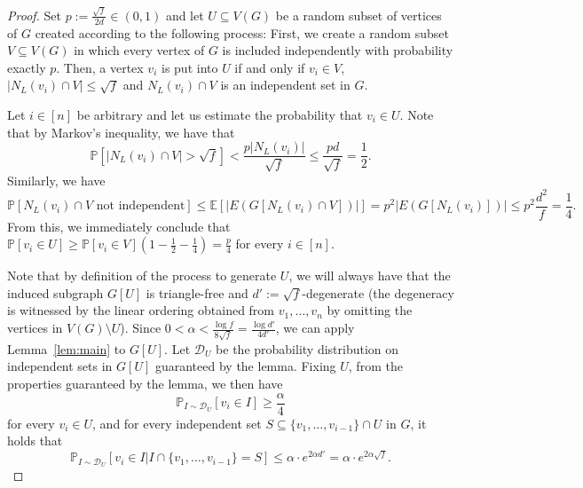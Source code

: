 \documentclass[10pt,a4paper]{amsart}
\begin{document}
    \begin{proof}
    Set $p:=\frac{\sqrt{f}}{2d}\in (0,1)$ and let $U\subseteq V(G)$ be a random subset of vertices of $G$ created according to the following process: First, we create a random subset $V\subseteq V(G)$ in which every vertex of $G$ is included independently with probability exactly $p$. Then, a vertex $v_i$ is put into $U$ if and only if $v_i\in V$, $|N_L(v_i)\cap V|\le \sqrt{f}$ and $N_L(v_i)\cap V$ is an independent set in $G$. 

    Let $i\in [n]$ be arbitrary and let us estimate the probability that $v_i\in U$. Note that by Markov's inequality, we have that
    $$\mathbb{P}[|N_L(v_i)\cap V|>\sqrt{f}]<\frac{p|N_L(v_i)|}{\sqrt{f}}\le \frac{
pd}{\sqrt{f}}=\frac{1}{2}.$$
Similarly, we have
$$\mathbb{P}[N_L(v_i)\cap V \text{ not independent}]\le \mathbb{E}[|E(G[N_L(v_i)\cap V])|]=p^2|E(G[N_L(v_i)])|\le p^2\frac{d^2}{f}=\frac{1}{4}.$$
From this, we immediately conclude that $\mathbb{P}[v_i\in U]\ge \mathbb{P}[v_i\in V](1-\frac{1}{2}-\frac{1}{4})=\frac{p}{4}$ for every $i\in [n]$. 
    
    Note that by definition of the process to generate $U$, we will always have that the induced subgraph $G[U]$ is triangle-free and $d':=\sqrt{f}$-degenerate (the degeneracy is witnessed by the linear ordering obtained from $v_1,\ldots,v_n$ by omitting the vertices in $V(G)\setminus U$). Since $0<\alpha<\frac{\log f}{8\sqrt{f}}= \frac{\log d'}{4d'}$, we can apply Lemma~\ref{lem:main} to $G[U]$. Let $\mathcal{D}_U$ be the probability distribution on independent sets in $G[U]$ guaranteed by the lemma. Fixing $U$, from the properties guaranteed by the lemma, we then have
    $$\mathbb{P}_{I\sim \mathcal{D}_U}[v_i\in I]\ge \frac{\alpha}{4}$$ for every $v_i\in U$, and for every independent set $S\subseteq \{v_1,\ldots,v_{i-1}\}\cap U$ in $G$, it holds that
    $$\mathbb{P}_{I\sim \mathcal{D}_U}[v_i\in I|I\cap \{v_1,\ldots,v_{i-1}\}=S]\le \alpha\cdot e^{2\alpha d'}=\alpha\cdot e^{2\alpha\sqrt{f}}.$$


\end{proof}
\end{document}
